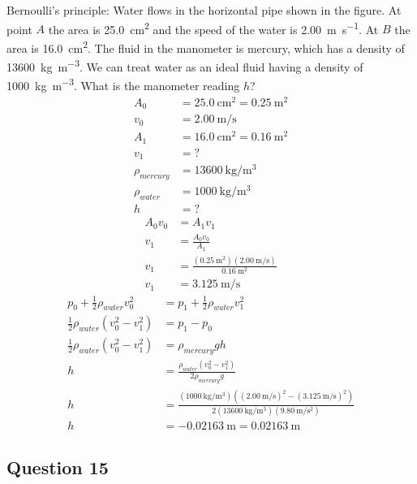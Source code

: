 \documentclass{article}
\begin{document}
Bernoulli's principle: Water flows in the horizontal pipe shown in the figure. At point $ A $ the area is \SI{25.0}{\centi \meter \squared} and the speed of the water is \SI{2.00}{\meter \per \second}. At $ B $ the area is \SI{16.0}{\centi \meter \squared}. The fluid in the manometer is mercury, which has a density of \SI{13600}{\kilogram \per \meter \cubed}. We can treat water as an ideal fluid having a density of \SI{1000}{\kilogram \per \meter \cubed}. What is the manometer reading $ h $?
\begin{align*}
	A_0 & = \SI{25.0}{\centi \meter \squared} = \SI{0.25}{\meter \squared} \\
	v_0 & = \SI{2.00}{\meter \per \second} \\
	A_1 & = \SI{16.0}{\centi \meter \squared} = \SI{0.16}{\meter \squared} \\
	v_1 & = ? \\
	\rho_{mercury} & = \SI{13600}{\kilogram \per \meter \cubed} \\
	\rho_{water} & = \SI{1000}{\kilogram \per \meter \cubed} \\
	h & = ?
\end{align*}
\begin{align*}
	A_0v_0 & = A_1v_1 \\
	v_1 & = \frac{ A_0v_0 }{ A_1 } \\
	v_1 & = \frac{ (\SI{0.25}{\meter \squared})(\SI{2.00}{\meter \per \second}) }{ \SI{0.16}{\meter \squared} } \\
	v_1 & = \SI{3.125}{\meter \per \second}
\end{align*}
\begin{align*}
	p_0 + \frac{1}{2}\rho_{water}v_0^2 & = p_1 + \frac{1}{2}\rho_{water}v_1^2 \\
	\frac{1}{2}\rho_{water}(v_0^2 - v_1^2) & = p_1 - p_0 \\
	\frac{1}{2}\rho_{water}(v_0^2 - v_1^2) & = \rho_{mercury}gh \\
	h & = \frac{ \rho_{water}(v_0^2 - v_1^2) }{ 2\rho_{mercury}g } \\
	h & = \frac{ (\SI{1000}{\kilogram \per \meter \cubed})((\SI{2.00}{\meter \per \second})^2 - (\SI{3.125}{\meter \per \second})^2) }{ 2(\SI{13600}{\kilogram \per \meter \cubed})(\SI{9.80}{\meter \per \second \squared}) } \\
	h & = \SI{-0.02163}{\meter} = \SI{0.02163}{\meter}
\end{align*}

\subsection{Question 15}
\end{document}
